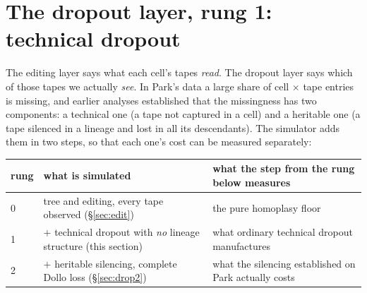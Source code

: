 
\section{The dropout layer, rung 1: technical dropout}\label{sec:drop1}

The editing layer says what each cell's tapes \emph{read}. The dropout layer says which of those
tapes we actually \emph{see}. In Park's data a large share of cell $\times$ tape entries is missing,
and earlier analyses established that the missingness has two components: a technical one (a tape
not captured in a cell) and a heritable one (a tape silenced in a lineage and lost in all its
descendants). The simulator adds them in two steps, so that each one's cost can be measured
separately:

\begin{center}\small
\begin{tabular}{@{}lp{}p{}@{}}
\toprule
rung & what is simulated & what the step from the rung below measures \\
\midrule
0 & tree and editing, every tape observed (\S\ref{sec:edit}) & the pure homoplasy floor \\
1 & $+$ technical dropout with \emph{no} lineage structure (this section) & what ordinary technical
      dropout manufactures \\
2 & $+$ heritable silencing, complete Dollo loss (\S\ref{sec:drop2}) & what the silencing
      established on Park actually costs \\
\bottomrule
\end{tabular}
\end{center}

